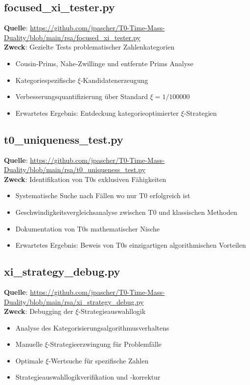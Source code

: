 \documentclass[12pt,a4paper]{article}
\begin{document}
	\subsection{focused\_xi\_tester.py}
	\textbf{Quelle}: \url{https://github.com/jpascher/T0-Time-Mass-Duality/blob/main/rsa/focused_xi_tester.py}\\
	\textbf{Zweck}: Gezielte Tests problematischer Zahlenkategorien
	\begin{itemize}
		\item Cousin-Prims, Nahe-Zwillinge und entfernte Prims Analyse
		\item Kategoriespezifische $\xi$-Kandidatenerzeugung
		\item Verbesserungsquantifizierung über Standard $\xi = 1/100000$
		\item Erwartetes Ergebnis: Entdeckung kategorieoptimierter $\xi$-Strategien
	\end{itemize}
	
	\subsection{t0\_uniqueness\_test.py}
	\textbf{Quelle}: \url{https://github.com/jpascher/T0-Time-Mass-Duality/blob/main/rsa/t0_uniqueness_test.py}\\
	\textbf{Zweck}: Identifikation von T0s exklusiven Fähigkeiten
	\begin{itemize}
		\item Systematische Suche nach Fällen wo nur T0 erfolgreich ist
		\item Geschwindigkeitsvergleichsanalyse zwischen T0 und klassischen Methoden
		\item Dokumentation von T0s mathematischer Nische
		\item Erwartetes Ergebnis: Beweis von T0s einzigartigen algorithmischen Vorteilen
	\end{itemize}
	
	\subsection{xi\_strategy\_debug.py}
	\textbf{Quelle}: \url{https://github.com/jpascher/T0-Time-Mass-Duality/blob/main/rsa/xi_strategy_debug.py}\\
	\textbf{Zweck}: Debugging der $\xi$-Strategieauswahllogik
	\begin{itemize}
		\item Analyse des Kategorisierungsalgorithmusverhaltens
		\item Manuelle $\xi$-Strategieerzwingung für Problemfälle
		\item Optimale $\xi$-Wertsuche für spezifische Zahlen
		\item Strategieauswahllogikverifikation und -korrektur
	\end{itemize}
	
\end{document}
